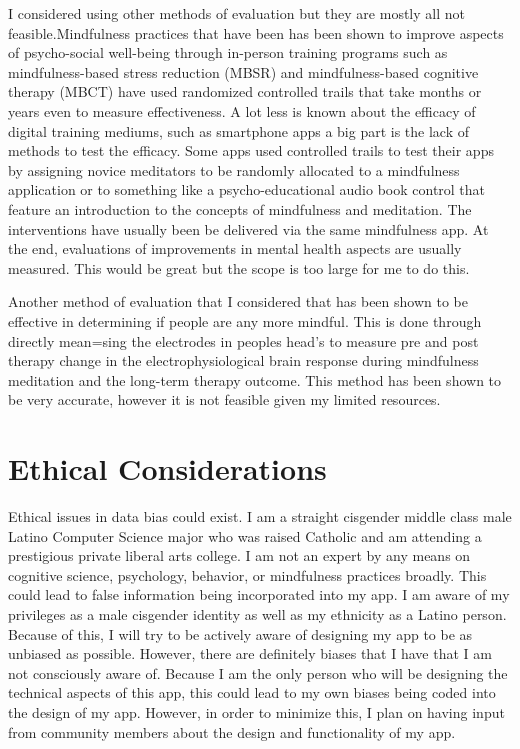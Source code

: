 \documentclass[12pt,twocolumn]{article}
\begin{document}
I considered using other methods of evaluation but they are mostly all not feasible.Mindfulness practices that have been has been shown to improve aspects of psycho-social well-being through in-person training programs such as mindfulness-based stress reduction (MBSR) and mindfulness-based cognitive therapy (MBCT) have used randomized controlled trails that take months or years even to measure effectiveness. A lot less is known about the efficacy of digital training mediums, such as smartphone apps a big part is the lack of methods to test the efficacy. Some apps used controlled trails to test their apps by  assigning novice meditators to be randomly allocated to a mindfulness  application or to something like a  psycho-educational audio book control that feature an introduction to the concepts of mindfulness and meditation. The interventions have usually been be delivered via the same mindfulness app. At the end, evaluations of improvements in mental health aspects are usually  measured. This would be great but the scope is too large for me to do this.

Another method of evaluation that I considered that has been shown to be effective in determining if people are any more mindful. This is done through directly mean=sing the electrodes in peoples head's to measure pre and post therapy change in the electrophysiological brain response during mindfulness meditation and the long-term therapy outcome. This method has been shown to be very accurate, however it is not feasible given my limited resources. 

\section{Ethical Considerations}
Ethical issues in data bias could exist. I am a straight cisgender middle class male Latino Computer Science major who was raised Catholic and am attending a prestigious private liberal arts college. I am not an expert by any means on cognitive science, psychology, behavior, or mindfulness practices broadly. This could lead to false information being incorporated into my app. I am aware of my privileges as a male cisgender identity as well as my ethnicity as a Latino person. Because of this, I will try to be actively aware of designing my app to be as unbiased as possible. However, there are definitely  biases that I have that I am not consciously aware of. Because I am the only person who will be designing the technical aspects of this app, this could lead to my own biases being coded into the design of my app. However, in order to minimize this, I plan on having input from community members about the design and functionality of my app.
\end{document}
